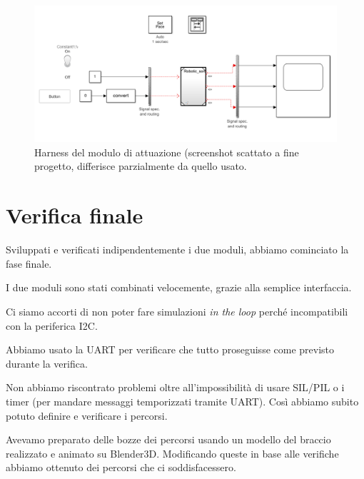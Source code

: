\documentclass[12pt]{report}
\begin{document}
\begin{figure}
\includegraphics[width=\textwidth]{Harness}
\caption{Harness del modulo di attuazione (screenshot scattato a fine progetto, differisce parzialmente da quello usato.}
\end{figure}

\chapter{Verifica finale}

Sviluppati e verificati indipendentemente i due moduli, abbiamo cominciato la fase finale.

I due moduli sono stati combinati velocemente, grazie alla semplice interfaccia.

Ci siamo accorti di non poter fare simulazioni \emph{in the loop} perché incompatibili con la periferica I2C.

Abbiamo usato la UART per verificare che tutto proseguisse come previsto durante la verifica.

Non abbiamo riscontrato problemi oltre all'impossibilità di usare SIL/PIL o i timer (per mandare messaggi temporizzati tramite UART). Così abbiamo subito potuto definire e verificare i percorsi.

Avevamo preparato delle bozze dei percorsi usando un modello del braccio realizzato e animato su Blender3D. Modificando queste in base alle verifiche abbiamo ottenuto dei percorsi che ci soddisfacessero.
\end{document}
